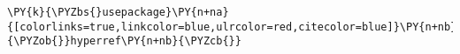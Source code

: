 \begin{Verbatim}[commandchars=\\\{\}]
\PY{k}{\PYZbs{}usepackage}\PY{n+na}{[colorlinks=true,linkcolor=blue,ulrcolor=red,citecolor=blue]}\PY{n+nb}{\PYZob{}}hyperref\PY{n+nb}{\PYZcb{}}
\end{Verbatim}
